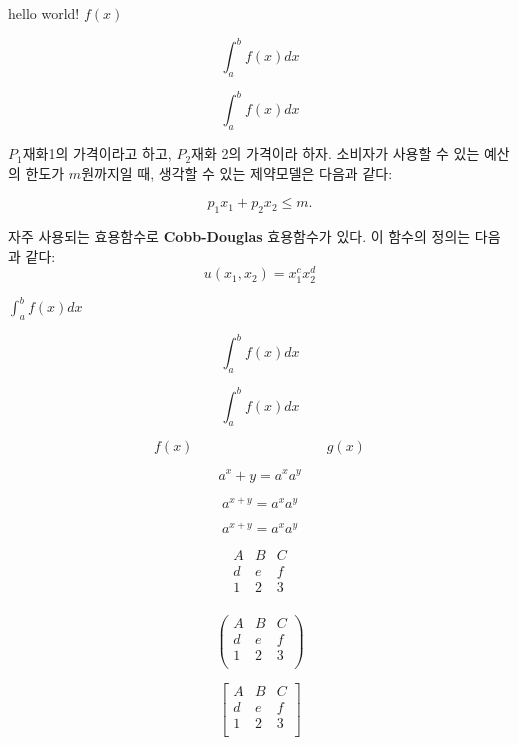 \documentclass[footnote]{oblivoir}
\theoremstyle{definition}
\begin{document}
hello world! $f(x)$

\[\int_{a}^b f(x)dx \]

\begin{equation}
\int_{a}^b f(x)dx
\end{equation}

$P_1$\을 재화1의 가격이라고 하고, $P_2$\를 재화 2의 가격이라 하자. 소비자가 사용할 수 있는 예산의 한도가 $m$원까지일 때, 생각할 수 있는 제약모델은 다음과 같다:

\begin{equation}
p_1 x_1 + p_2 x_2 \leq m.
\end{equation}

자주 사용되는 효용함수로 \textbf{Cobb-Douglas} 효용함수가 있다. 이 함수의 정의는 다음과 같다:
\[u(x_1, x_2) = x_1^c x_2^d\]

$\int_a^b f(x)dx$

\[ \int_{a}^b f(x)dx \]

\begin{equation}
\int_{a}^b f(x)dx
\end{equation}

\begin{equation}
f(x) \hspace{4cm} g(x)
\end{equation}

\begin{equation}
a^x+y = a^x a^y
\end{equation}

\begin{equation*}
a^{x+y} = a^x a^y
\end{equation*}

\[
a^{x+y} = a^x a^y
\]

\[\begin{matrix}
A & B & C \\
d & e & f \\
1 & 2 & 3 \\
\end{matrix}\]

\[\begin{pmatrix}
A & B & C \\
d & e & f \\
1 & 2 & 3 \\
\end{pmatrix}\]

\[\begin{bmatrix}
A & B & C \\
d & e & f \\
1 & 2 & 3 \\
\end{bmatrix}\]
\end{document}
